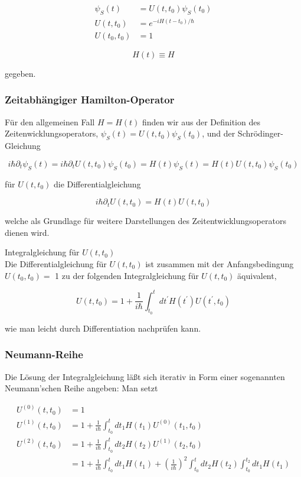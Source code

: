 \documentclass[10pt, letterpaper]{article}
\begin{document}
$$
\begin{aligned}
\psi_{S}(t) & =U\left(t, t_{0}\right) \psi_{S}\left(t_{0}\right) \\
U\left(t, t_{0}\right) & =e^{-i H\left(t-t_{0}\right) / \hbar} \\
U\left(t_{0}, t_{0}\right) & =1
\end{aligned}
$$

$$
H(t) \equiv H
$$

gegeben.

\subsubsection*{Zeitabhängiger Hamilton-Operator}
Für den allgemeinen Fall $H=H(t)$ finden wir aus der Definition des Zeitenwicklungsoperators, $\psi_{S}(t)=U\left(t, t_{0}\right) \psi_{S}\left(t_{0}\right)$, und der Schrödinger-Gleichung

$$
i \hbar \partial_{t} \psi_{S}(t)=i \hbar \partial_{t} U\left(t, t_{0}\right) \psi_{S}\left(t_{0}\right)=H(t) \psi_{S}(t)=H(t) U\left(t, t_{0}\right) \psi_{S}\left(t_{0}\right)
$$

für $U\left(t, t_{0}\right)$ die Differentialgleichung

$$
i \hbar \partial_{t} U\left(t, t_{0}\right)=H(t) U\left(t, t_{0}\right)
$$

welche als Grundlage für weitere Darstellungen des Zeitentwicklungsoperators dienen wird.

Integralgleichung für $U\left(t, t_{0}\right)$\\
Die Differentialgleichung für $U\left(t, t_{0}\right)$ ist zusammen mit der Anfangsbedingung $U\left(t_{0}, t_{0}\right)=$ 1 zu der folgenden Integralgleichung für $U\left(t, t_{0}\right)$ äquivalent,

$$
U\left(t, t_{0}\right)=1+\frac{1}{i \hbar} \int_{t_{0}}^{t} d t^{\prime} H\left(t^{\prime}\right) U\left(t^{\prime}, t_{0}\right)
$$

wie man leicht durch Differentiation nachprüfen kann.

\subsubsection*{Neumann-Reihe}
Die Lösung der Integralgleichung läßt sich iterativ in Form einer sogenannten Neumann'schen Reihe angeben: Man setzt

$$
\begin{aligned}
U^{(0)}\left(t, t_{0}\right) & =1 \\
U^{(1)}\left(t, t_{0}\right) & =1+\frac{1}{i \hbar} \int_{t_{0}}^{t} d t_{1} H\left(t_{1}\right) U^{(0)}\left(t_{1}, t_{0}\right) \\
U^{(2)}\left(t, t_{0}\right) & =1+\frac{1}{i \hbar} \int_{t_{0}}^{t} d t_{2} H\left(t_{2}\right) U^{(1)}\left(t_{2}, t_{0}\right) \\
& =1+\frac{1}{i \hbar} \int_{t_{0}}^{t} d t_{1} H\left(t_{1}\right)+\left(\frac{1}{i \hbar}\right)^{2} \int_{t_{0}}^{t} d t_{2} H\left(t_{2}\right) \int_{t_{0}}^{t_{2}} d t_{1} H\left(t_{1}\right)
\end{aligned}
$$
\end{document}

